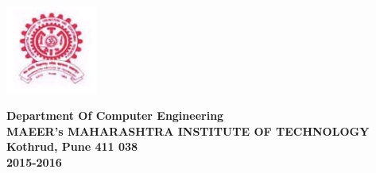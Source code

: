 \documentclass[12pt,a4paper]{report}
\begin{document}
		\vspace{0.3 in}
\begin{center}
\includegraphics[width=3cm]{mitlogo}
\end{center}

		\begin{center}
	  \textbf{Department Of Computer Engineering}\\
\bf{MAEER’s MAHARASHTRA INSTITUTE OF TECHNOLOGY} \\
\textbf{Kothrud, Pune 411 038}\\
\textbf{2015-2016}
	\end{center}
\end{document}
